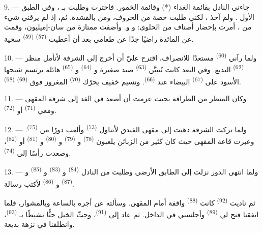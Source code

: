 \VUsaut{4.0mm}
\VUsaut{3.0mm}

9. --- جاءني النادل بقائمة الغداء (*) وقائمة الخمور. فاخترت وطلبت
 بـ ، وفي الطبق الأول
. ولم آخذ ، لكني طلبت حصة من
 الخروف، ومن   بالقشدة. ثم، إذ لم
يرقني شيء من ، أمرت بإحضار أصناف من الحلوى:
 و و. وأضفت  ممتازة
من سان-إميليون، وقمت عن المائدة راضيًا جدًا عن طعامي بعد أن أعطيت
 \textsuperscript{(57)}  \textsuperscript{(59)} سخية.

10. --- ولما رآني  \textsuperscript{(60)} مستعدًا للانصراف، اقترح
عليّ أن أخرج إلى الشرفة لأتأمل منظر  \textsuperscript{(62)} البديع.
وفي البعد كانت تُتبيَّن  \textsuperscript{(63)} صيد صغيرة
و \textsuperscript{(64)} و \textsuperscript{(65)} هائلة
يرتسم شبحها الأسود على  \textsuperscript{(67)} البيضاء عند
 \textsuperscript{(66)}. ونسيم خفيف يحرّك 
\textsuperscript{(70)} المغروز فوق  \textsuperscript{(69)}
 \textsuperscript{(68)}.

\VUsaut{3.0mm}
\VUsaut{3.0mm}

11. --- وكان المنظر من الطرافة بحيث عزمت أن أصعد في الغد إلى شرفة المقهى
ومعي  \textsuperscript{(71)} أو 
\textsuperscript{(72)}.

12. --- ولما تركت الشرفة ذهبت إلى مقهى الفندق لأتناول 
\textsuperscript{(73)} وألعب دورًا من  \textsuperscript{(75)}. وعبرت
قاعة المقهى حيث كان كثير من الزبائن يلعبون  \textsuperscript{(78)}
و \textsuperscript{(79)} و \textsuperscript{(80)}
و \textsuperscript{(81)} أو  \textsuperscript{(82)}،
وصعدت رأسًا إلى  \textsuperscript{(74)}.

13. --- ولما انتهى الدور نزلت إلى الطابق الأرضي وطلبت من النادل
 \textsuperscript{(84)} و \textsuperscript{(83)}
و \textsuperscript{(85)} و \textsuperscript{(87)}
و \textsuperscript{(86)} لأكتب رسالة.

ثم ناديت  \textsuperscript{(92)} كانت 
\textsuperscript{(88)} واقفة أمام المقهى. وسألته عن أجره بالساعة وبالمشوار، فلما
اتفقنا فتح لي  \textsuperscript{(89)} وأجلسني في الداخل. ثم
عاد إلى  \textsuperscript{(91)}، وحثّ الخيل حثًّا نشيطًا
بـ \textsuperscript{(93)}، وانطلقنا في نزهة بديعة.
\VUsaut{6.0mm}
\VUfilet{22mm}
